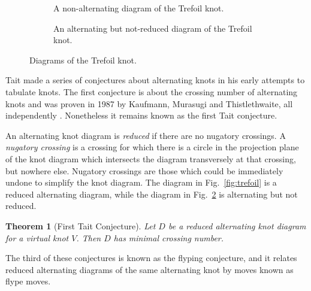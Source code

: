 \documentclass[12pt]{report}
\newtheorem*{theorem}{Theorem}
\theoremstyle{upright}
\begin{document}
\begin{figure}[hbt!]
	\centering
	\hspace*{\fill}
	\begin{subfigure}[b]{0.4 \textwidth}
		\centering
		\def\svgscale{0.23}
		
		\caption{A non-alternating diagram of the Trefoil knot.}
		\label{fig:trefoil-nonalternating}
	\end{subfigure}
	\hspace*{\fill} \hspace*{\fill}	\hspace*{\fill}
	\begin{subfigure}[b]{0.4 \textwidth}
		\centering
		\def\svgscale{0.23}
		
		\caption{An alternating but not-reduced diagram of the Trefoil knot.}
		\label{fig:trefoil-nugatory}
	\end{subfigure}
	\hspace*{\fill} 
	\caption{Diagrams of the Trefoil knot.}
	\label{fig:trefoil-diagrams}
\end{figure}

Tait made a series of conjectures about alternating knots in his early attempts to tabulate knots. The first conjecture is about the crossing number of alternating knots and was proven in 1987 by Kaufmann, Murasugi and Thistlethwaite, all independently \cite{state-models-jones-polynomial, jones-polynomials-classical-conjectures, spanning-tree-expansion-jones-polynomial}. Nonetheless it remains known as the first Tait conjecture.

An alternating knot diagram is \textit{reduced} if there are no nugatory crossings. A \textit{nugatory crossing} is a crossing for which there is a circle in the projection plane of the knot diagram which intersects the diagram transversely at that crossing, but nowhere else. Nugatory crossings are those which could be immediately undone to simplify the knot diagram. The diagram in Fig.~\ref{fig:trefoil} is a reduced alternating diagram, while the diagram in Fig.~\ref{fig:trefoil-nugatory} is alternating but not reduced.

\begin{theorem}[First Tait Conjecture]
Let $D$ be a reduced alternating knot diagram for a virtual knot $V$. Then $D$ has minimal crossing number.
\end{theorem}

The third of these conjectures is known as the flyping conjecture, and it relates reduced alternating diagrams of the same alternating knot by moves known as flype moves.
\end{document}

